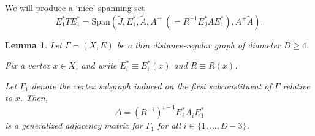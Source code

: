 \documentclass[
]{book}
\newtheorem{lemma}{Lemma}[chapter]
\theoremstyle{definition}
\theoremstyle{definition}
\theoremstyle{definition}
\theoremstyle{definition}
\theoremstyle{remark}
\begin{document}
We will produce a `nice' spanning set
\[E^*_1TE^*_1 = \mathrm{Span}(\tilde{J}, E^*_1, \tilde{A}, A^+ \;(= R^{-1}E^*_2AE^*_1), A^+\tilde{A}).\]

\begin{lemma}
\protect\hypertarget{lem:generalized-adjacecy-matrix}{}\label{lem:generalized-adjacecy-matrix}Let \(\Gamma = (X, E)\) be a thin distance-regular graph of diameter \(D\geq 4\).

Fix a vertex \(x\in X\), and write \(E^*_i \equiv E^*_i(x)\) and \(R \equiv R(x)\).

Let \(\Gamma_1\) denote the vertex subgraph induced on the first subconstituent of \(\Gamma\) relative to \(x\). Then,
\[\Delta = (R^{-1})^{i-1}E^*_iA_iE^*_1\]
is a generalized adjacency matrix for \(\Gamma_1\) for all \(i\in \{1, \ldots, D-3\}\).
\end{lemma}
\end{document}
